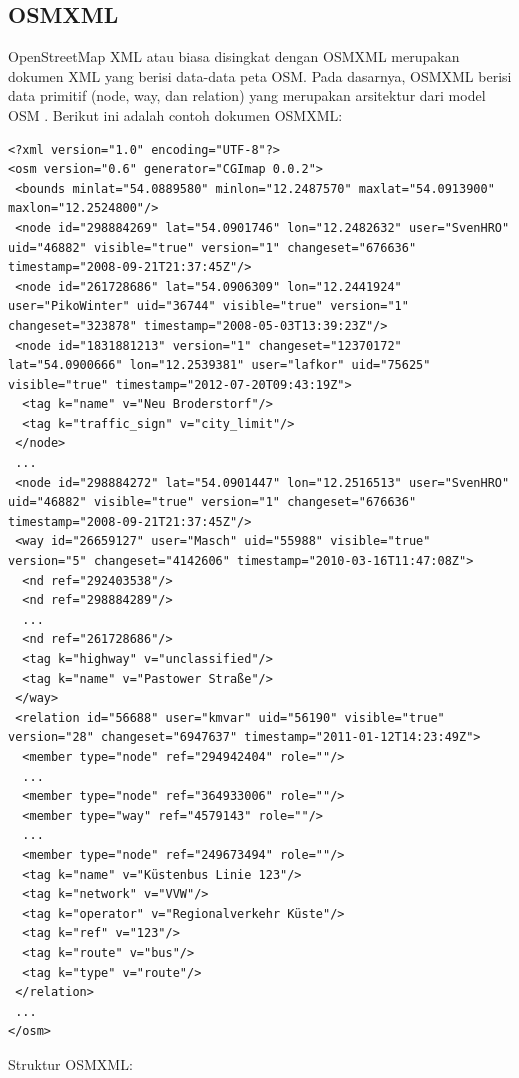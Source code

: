 \subsection{OSMXML} \label{ssec:osmxml}
OpenStreetMap XML atau biasa disingkat dengan OSMXML merupakan dokumen XML yang
berisi data-data peta OSM. Pada dasarnya, OSMXML berisi data primitif
(node, way, dan relation) yang merupakan arsitektur dari model OSM
\cite{osm}.
Berikut ini adalah contoh dokumen OSMXML:
\begin{lstlisting}
<?xml version="1.0" encoding="UTF-8"?>
<osm version="0.6" generator="CGImap 0.0.2">
 <bounds minlat="54.0889580" minlon="12.2487570" maxlat="54.0913900" maxlon="12.2524800"/>
 <node id="298884269" lat="54.0901746" lon="12.2482632" user="SvenHRO" uid="46882" visible="true" version="1" changeset="676636" timestamp="2008-09-21T21:37:45Z"/>
 <node id="261728686" lat="54.0906309" lon="12.2441924" user="PikoWinter" uid="36744" visible="true" version="1" changeset="323878" timestamp="2008-05-03T13:39:23Z"/>
 <node id="1831881213" version="1" changeset="12370172" lat="54.0900666" lon="12.2539381" user="lafkor" uid="75625" visible="true" timestamp="2012-07-20T09:43:19Z">
  <tag k="name" v="Neu Broderstorf"/>
  <tag k="traffic_sign" v="city_limit"/>
 </node>
 ...
 <node id="298884272" lat="54.0901447" lon="12.2516513" user="SvenHRO" uid="46882" visible="true" version="1" changeset="676636" timestamp="2008-09-21T21:37:45Z"/>
 <way id="26659127" user="Masch" uid="55988" visible="true" version="5" changeset="4142606" timestamp="2010-03-16T11:47:08Z">
  <nd ref="292403538"/>
  <nd ref="298884289"/>
  ...
  <nd ref="261728686"/>
  <tag k="highway" v="unclassified"/>
  <tag k="name" v="Pastower Straße"/>
 </way>
 <relation id="56688" user="kmvar" uid="56190" visible="true" version="28" changeset="6947637" timestamp="2011-01-12T14:23:49Z">
  <member type="node" ref="294942404" role=""/>
  ...
  <member type="node" ref="364933006" role=""/>
  <member type="way" ref="4579143" role=""/>
  ...
  <member type="node" ref="249673494" role=""/>
  <tag k="name" v="Küstenbus Linie 123"/>
  <tag k="network" v="VVW"/>
  <tag k="operator" v="Regionalverkehr Küste"/>
  <tag k="ref" v="123"/>
  <tag k="route" v="bus"/>
  <tag k="type" v="route"/>
 </relation>
 ...
</osm>
\end{lstlisting}
Struktur OSMXML:
